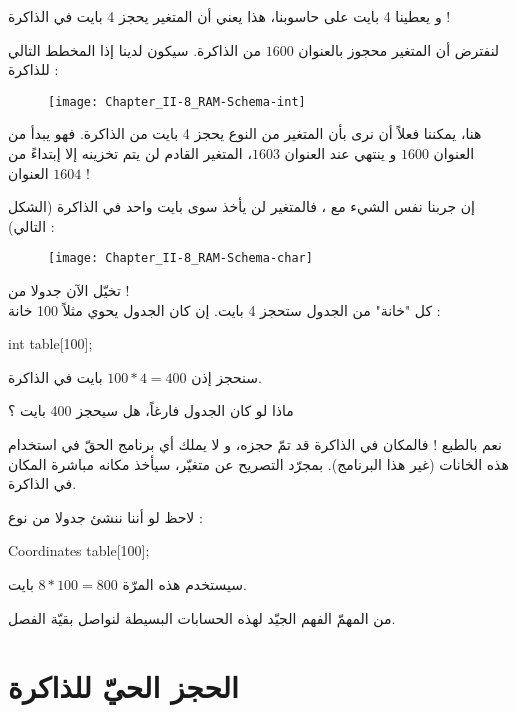 و
يعطينا 4 بايت على حاسوبنا، هذا يعني أن المتغير يحجز 4 بايت في الذاكرة !

لنفترض أن المتغير
محجوز بالعنوان
$1600$
من الذاكرة. سيكون لدينا إذا المخطط التالي للذاكرة :

\begin{figure}[H]
	\centering
	\texttt{[image: Chapter\_II-8\_RAM-Schema-int]}
\end{figure}

هنا، يمكننا فعلاً أن نرى بأن المتغير
من النوع
يحجز 4 بايت من الذاكرة.
فهو يبدأ من العنوان
$1600$
و ينتهي عند العنوان
$1603$،
المتغير القادم لن يتم تخزينه إلا إبتداءً من العنوان
$1604$ !

إن جربنا نفس الشيء مع
،
فالمتغير لن يأخذ سوى بايت واحد في الذاكرة (الشكل التالي) :

\begin{figure}[H]
	\centering
	\texttt{[image: Chapter\_II-8\_RAM-Schema-char]}
\end{figure}

تخيّل الآن جدولا من
 !\\
كل "خانة" من الجدول ستحجز 4 بايت. إن كان الجدول يحوي مثلاً  100 خانة :

\begin{Csource}
int table[100];
\end{Csource}

سنحجز إذن
$100 * 4 = 400$
بايت في الذاكرة.

\begin{question}
ماذا لو كان الجدول فارغاً، هل سيحجز 400 بايت ؟
\end{question}

نعم بالطبع ! فالمكان  في الذاكرة قد تمّ حجزه، و لا يملك أي برنامج الحقّ في استخدام هذه الخانات (غير هذا البرنامج). بمجرّد التصريح عن متغيّر، سيأخذ مكانه مباشرة المكان في الذاكرة.

لاحظ لو أننا ننشئ جدولا من نوع
 :

\begin{Csource}
Coordinates table[100];
\end{Csource}

سيستخدم هذه المرّة
$8 * 100 = 800$
بايت.

من المهمّ الفهم الجيّد لهذه الحسابات البسيطة لنواصل بقيّة الفصل.

\section{الحجز الحيّ للذاكرة}


